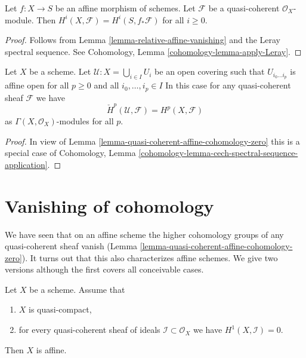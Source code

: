 \begin{lemma}
\label{lemma-relative-affine-cohomology}
Let $f : X \to S$ be an affine morphism of schemes.
Let $\mathcal{F}$ be a quasi-coherent $\mathcal{O}_X$-module.
Then $H^i(X, \mathcal{F}) = H^i(S, f_*\mathcal{F})$ for all $i \geq 0$.
\end{lemma}

\begin{proof}
Follows from Lemma \ref{lemma-relative-affine-vanishing}
and the Leray spectral sequence. See
Cohomology, Lemma \ref{cohomology-lemma-apply-Leray}.
\end{proof}

\begin{lemma}
\label{lemma-cech-cohomology-quasi-coherent}
Let $X$ be a scheme.
Let $\mathcal{U} : X = \bigcup_{i \in I} U_i$ be an open covering such that
$U_{i_0 \ldots i_p}$ is affine open for all $p \ge 0$ and all
$i_0, \ldots, i_p \in I$
In this case for any quasi-coherent sheaf $\mathcal{F}$ we have
$$
\check{H}^p(\mathcal{U}, \mathcal{F}) = H^p(X, \mathcal{F})
$$
as $\Gamma(X, \mathcal{O}_X)$-modules for all $p$.
\end{lemma}

\begin{proof}
In view of
Lemma \ref{lemma-quasi-coherent-affine-cohomology-zero}
this is a special case of
Cohomology, Lemma
\ref{cohomology-lemma-cech-spectral-sequence-application}.
\end{proof}







\section{Vanishing of cohomology}
\label{section-vanishing}

\noindent
We have seen that on an affine scheme the higher cohomology groups
of any quasi-coherent sheaf vanish
(Lemma \ref{lemma-quasi-coherent-affine-cohomology-zero}).
It turns out that this also
characterizes affine schemes. We give two versions although the
first covers all conceivable cases.

\begin{lemma}
\label{lemma-quasi-compact-h1-zero-covering}
Let $X$ be a scheme.
Assume that
\begin{enumerate}
\item $X$ is quasi-compact,
\item for every quasi-coherent sheaf of ideals
$\mathcal{I} \subset \mathcal{O}_X$ we have $H^1(X, \mathcal{I}) = 0$.
\end{enumerate}
Then $X$ is affine.
\end{lemma}

